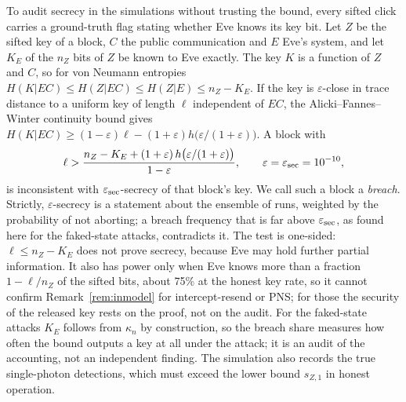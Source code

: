 To audit secrecy in the simulations without trusting the bound, every sifted click carries a ground-truth flag stating whether Eve knows its key bit. Let $Z$ be the sifted key of a block, $C$ the public communication and $E$ Eve's system, and let $K_E$ of the $n_Z$ bits of $Z$ be known to Eve exactly. The key $K$ is a function of $Z$ and $C$, so for von Neumann entropies $H(K|EC)\le H(Z|EC)\le H(Z|E)\le n_Z-K_E$. If the key is $\varepsilon$-close in trace distance to a uniform key of length $\ell$ independent of $EC$, the Alicki--Fannes--Winter continuity bound gives $H(K|EC)\ge(1-\varepsilon)\ell-(1+\varepsilon)h\bigl(\varepsilon/(1+\varepsilon)\bigr)$. A block with
\begin{equation}\label{eq:breach}
\ell>\frac{n_Z-K_E+(1+\varepsilon)\,h\bigl(\varepsilon/(1+\varepsilon)\bigr)}{1-\varepsilon},\qquad \varepsilon=\varepsilon_{\rm sec}=10^{-10},
\end{equation}
is inconsistent with $\varepsilon_{\rm sec}$-secrecy of that block's key. We call such a block a \emph{breach}. Strictly, $\varepsilon$-secrecy is a statement about the ensemble of runs, weighted by the probability of not aborting; a breach frequency that is far above $\varepsilon_{\rm sec}$, as found here for the faked-state attacks, contradicts it. The test is one-sided: $\ell\leq n_Z-K_E$ does not prove secrecy, because Eve may hold further partial information. It also has power only when Eve knows more than a fraction $1-\ell/n_Z$ of the sifted bits, about 75\% at the honest key rate, so it cannot confirm Remark~\ref{rem:inmodel} for intercept-resend or PNS; for those the security of the released key rests on the proof, not on the audit. For the faked-state attacks $K_E$ follows from $\kappa_n$ by construction, so the breach share measures how often the bound outputs a key at all under the attack; it is an audit of the accounting, not an independent finding. The simulation also records the true single-photon detections, which must exceed the lower bound $s_{Z,1}$ in honest operation.
